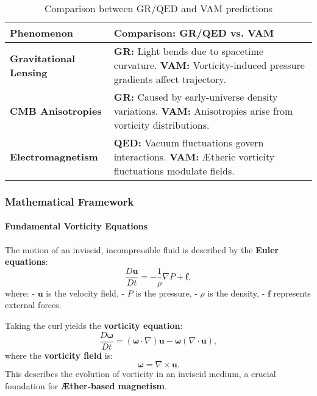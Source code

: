 \begin{table}[h]
    \centering
    \renewcommand{\arraystretch}{1.3}
    \begin{tabular}{|p{4.5cm}|p{9.5cm}|}
        \hline
        \textbf{Phenomenon} & \textbf{Comparison: GR/QED vs. VAM} \\
        \hline
        \textbf{Gravitational Lensing} &
        \textbf{GR:} Light bends due to spacetime curvature. \newline
        \textbf{VAM:} Vorticity-induced pressure gradients affect trajectory. \\
        \hline
        \textbf{CMB Anisotropies} &
        \textbf{GR:} Caused by early-universe density variations. \newline
        \textbf{VAM:} Anisotropies arise from vorticity distributions. \\
        \hline
        \textbf{Electromagnetism} &
        \textbf{QED:} Vacuum fluctuations govern interactions. \newline
        \textbf{VAM:} Ætheric vorticity fluctuations modulate fields. \\
        \hline
    \end{tabular}
    \caption{Comparison between GR/QED and VAM predictions}
    \label{tab:comparison}
\end{table}


    \subsubsection*{Mathematical Framework}

    \paragraph*{Fundamental Vorticity Equations}
    The motion of an inviscid, incompressible fluid is described by the \textbf{Euler equations}:
    \begin{equation}
        \frac{D\boldsymbol{u}}{Dt} = -\frac{1}{\rho} \nabla P + \boldsymbol{f},
    \end{equation}
    where:
    - \( \boldsymbol{u} \) is the velocity field,
    - \( P \) is the pressure,
    - \( \rho \) is the density,
    - \( \boldsymbol{f} \) represents external forces.

    Taking the curl yields the \textbf{vorticity equation}:
    \begin{equation}
        \frac{D\boldsymbol{\omega}}{Dt} = (\boldsymbol{\omega} \cdot \nabla) \boldsymbol{u} - \boldsymbol{\omega} (\nabla \cdot \boldsymbol{u}),
    \end{equation}
    where the \textbf{vorticity field} is:
    \begin{equation}
        \boldsymbol{\omega} = \nabla \times \boldsymbol{u}.
    \end{equation}
    This describes the evolution of vorticity in an inviscid medium, a crucial foundation for \textbf{Æther-based magnetism}.

